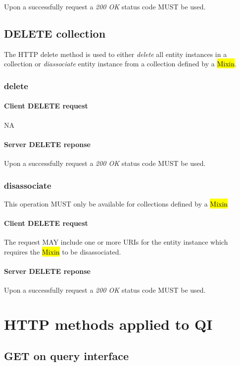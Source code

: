 \documentclass[10pt,a4paper]{article}
\begin{document}
Upon a successfully request a \emph{200 OK} status code MUST be used.

\subsection{DELETE collection}
The HTTP delete method is used to either {\em delete} all entity instances in a collection or {\em diassociate} entity instance from a collection defined by a \hl{Mixin}.

\subsubsection{delete}

\paragraph{Client DELETE request}
NA

\paragraph{Server DELETE reponse}
Upon a successfully request a \emph{200 OK} status code MUST be used.

\subsubsection{disassociate}
This operation MUST only be available for collections defined by a \hl{Mixin}

\paragraph{Client DELETE request}
The request MAY include one or more URIs for the entity instance which requires the \hl{Mixin} to be disassociated.

\paragraph{Server DELETE reponse}
Upon a successfully request a \emph{200 OK} status code MUST be used.

\section{HTTP methods applied to QI}

\subsection{GET on query interface}
\end{document}
